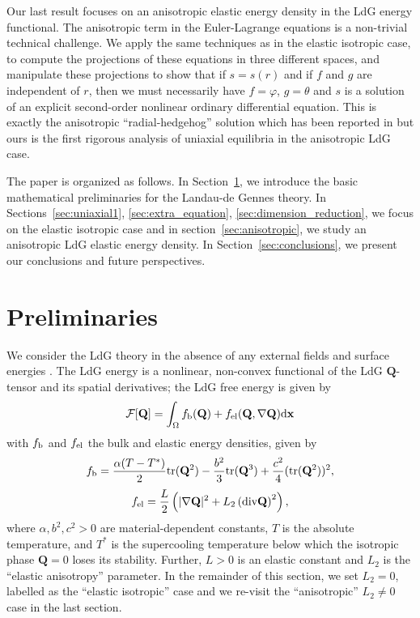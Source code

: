 \documentclass[10pt, a4paper]{article}
\newcommand\dd{\mathrm{d}}
\newcommand\x{\mathbf{x}}
\newcommand\Qvec{\mathbf{Q}}
\newcommand\tr{\mathrm{tr}}
\begin{document}
Our last result focuses on an anisotropic elastic energy density in the LdG energy functional. The anisotropic term in the Euler-Lagrange equations is a non-trivial technical challenge. 
We apply the same techniques as in the elastic isotropic case, to compute the projections of these equations in three different spaces, and manipulate these projections to show that if $s=s(r)$ and if $f$ and $g$ are independent of $r$, then we must necessarily have $f = \varphi$, $g = \theta$ and $s$ is a solution of an explicit second-order nonlinear ordinary differential equation. This is exactly the anisotropic ``radial-hedgehog'' solution which has been reported in \cite{mkaddemgartland1999} but ours is the first rigorous analysis of uniaxial equilibria in the anisotropic LdG case. %

The paper is organized as follows. In Section~\ref{sec:prelim}, we introduce the basic mathematical preliminaries for the Landau-de Gennes theory. In Sections~\ref{sec:uniaxial1}, \ref{sec:extra_equation}, \ref{sec:dimension_reduction}, we focus on the elastic isotropic case and in section~\ref{sec:anisotropic}, we study an anisotropic LdG elastic energy density. In Section~\ref{sec:conclusions}, we present our conclusions and future perspectives.


\section{Preliminaries}
\label{sec:prelim}

We consider the LdG theory in the absence of any external fields and surface energies \cite{amaz, lamy2015uniaxial, henaomajumdar2012}. The LdG energy is a nonlinear, non-convex functional of the LdG $\Qvec$-tensor and its spatial derivatives; the LdG free energy is given by \cite{dg}
\begin{equation}\label{LdG}
\mathcal{F}[\Qvec] = \int_{\Omega} f_{\rm b}(\Qvec) + f_{\rm el}(\Qvec, \nabla \Qvec) \dd \x 
\end{equation}
with $f_{\rm b}$ and $f_{\rm el}$ the bulk and elastic energy densities, given by
\begin{equation}
f_{\rm b} =  \frac{\alpha(T - T^{*})}{2} \tr(\Qvec^2) - \frac{b^2}{3}\tr(\Qvec^3) + \frac{c^2}{4} (\tr(\Qvec^2))^2,
\end{equation}
\begin{equation}
f_{\rm el} = \frac{L}{2} \left ( | \nabla \Qvec|^2 + L_2 \left(\textrm{div} \Qvec \right)^2 \right) , 
\end{equation}
where %
$\alpha, b^2, c^2 > 0$ are material-dependent constants, %
$T$ is the absolute temperature, and $T^{*}$ is the supercooling temperature below which the isotropic phase $\Qvec = 0$ loses its stability.
Further, $L > 0$ is an elastic constant and $L_2$ is the ``elastic anisotropy'' parameter. In the remainder of this section, we set $L_2=0$, labelled as the ``elastic isotropic'' case and we re-visit the ``anisotropic'' $L_2 \neq 0$ case in the last section.
\end{document}

